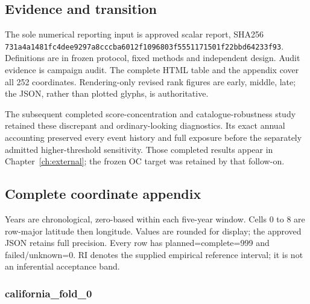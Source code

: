 \subsection{Evidence and transition}

The sole numerical reporting input is approved scalar report, SHA256 \nolinkurl{731a4a1481fc4dee9297a8cccba6012f1096803f5551171501f22bbd64233f93}. Definitions are in frozen protocol, fixed methods and independent design. Audit evidence is campaign audit. The complete HTML table and the appendix cover all 252 coordinates. Rendering-only revised rank figures are early, middle, late; the JSON, rather than plotted glyphs, is authoritative.

The subsequent completed score-concentration and catalogue-robustness study retained these discrepant and ordinary-looking diagnostics. Its exact annual accounting preserved every event history and full exposure before the separately admitted higher-threshold sensitivity. Those completed results appear in Chapter~\ref{ch:external}; the frozen OC target was retained by that follow-on.

\subsection{Complete coordinate appendix}

Years are chronological, zero-based within each five-year window. Cells 0 to 8 are row-major latitude then longitude. Values are rounded for display; the approved JSON retains full precision. Every row has planned=complete=999 and failed/unknown=0. RI denotes the supplied empirical reference interval; it is not an inferential acceptance band.

\subsubsection{california\_\allowbreak{}fold\_\allowbreak{}0}


